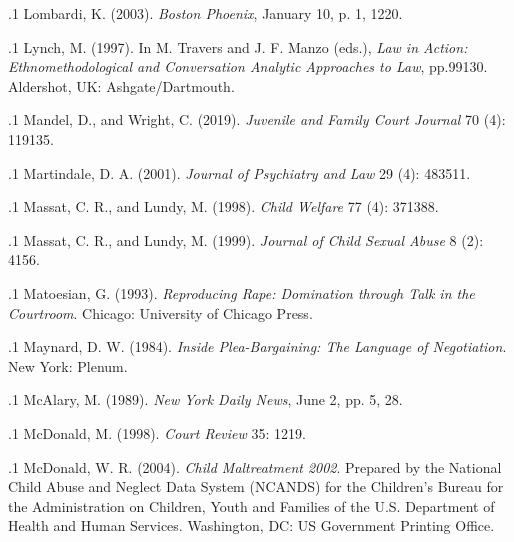 \documentclass[11pt, twoside]{article}
\begin{document}
{\p.1{%
Lombardi, K. (2003).  \textit{Boston Phoenix}, January 10, p. 1, 12\ndash{}20.
}%

\p.1{%
Lynch, M. (1997).  In M. Travers and J. F. Manzo (eds.), \textit{Law in Action:
Ethnomethodological and Conversation Analytic Approaches to Law}, pp.\@ 99\ndash{}130.
Aldershot, UK: Ashgate/Dartmouth.
}%

\p.1{%
Mandel, D., and Wright, C. (2019).  \textit{Juvenile and Family Court Journal} 70 (4): 119\ndash{}135.
}%

\p.1{%
Martindale, D. A. (2001).  \textit{Journal of Psychiatry and Law} 29 (4): 483\ndash{}511.
}%

\p.1{%
Massat, C. R., and Lundy, M. (1998).  \textit{Child Welfare} 77 (4): 371\ndash{}388.
}%

\p.1{%
Massat, C. R., and Lundy, M. (1999).  \textit{Journal of Child Sexual Abuse} 8 (2):
41\ndash{}56.
}%

\p.1{%
Matoesian, G. (1993). \textit{Reproducing Rape: Domination through
Talk in the Courtroom}. Chicago: University of Chicago Press.
}%

\p.1{%
Maynard, D. W. (1984). \textit{Inside Plea-Bargaining: The Language of Negotiation}. New
York: Plenum.
}%

\p.1{%
McAlary, M. (1989).  \textit{New York Daily News}, June 2, pp.\@
5, 28.
}%

\p.1{%
McDonald, M. (1998).  \textit{Court Review} 35: 12\ndash{}19.
}%

\p.1{%
McDonald, W. R. (2004). \textit{Child Maltreatment 2002}. Prepared by the National Child
Abuse and Neglect Data System (NCANDS) for the Children’s Bureau for the Administration on Children, Youth and Families of the U.S. Department of Health
and Human Services. Washington, DC: US Government Printing Office.
}%

}
\end{document}
